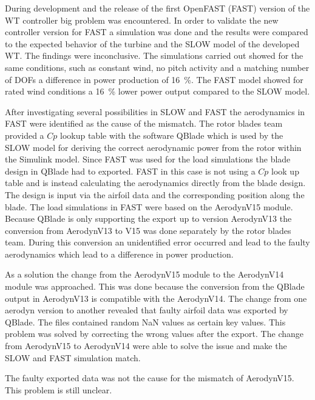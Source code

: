 During development and the release of the first OpenFAST (FAST) version of the WT controller big problem was encountered.
In order to validate the new controller version for FAST a simulation was done and the results were compared to the expected behavior of the turbine and the SLOW model of the developed WT.
The findings were inconclusive.
The simulations carried out showed for the same conditions, such as constant wind, no pitch activity and a matching number of DOFs a difference in power production of \SI{16}{\%}. The FAST model showed for rated wind conditions a \SI{16}{\%} lower power output compared to the SLOW model.

After investigating several possibilities in SLOW and FAST the aerodynamics in FAST were identified as the cause of the mismatch.
The rotor blades team provided a $Cp$ lookup table with the software QBlade which is used by the SLOW model for deriving the correct aerodynamic power from the rotor within the Simulink model.
Since FAST was used for the load simulations the blade design in QBlade had to exported. FAST in this case is not using a $Cp$ look up table and is instead calculating the aerodynamics directly from the blade design.
The design is input via the airfoil data and the corresponding position along the blade.
The load simulations in FAST were based on the AerodynV15 module.
Because QBlade is only supporting the export up to version AerodynV13 the conversion from AerodynV13 to V15 was done separately by the rotor blades team.
During this conversion an unidentified error occurred and lead to the faulty aerodynamics which lead to a difference in power production.

As a solution the change from the AerodynV15 module to the AerodynV14 module was approached.
This was done because the conversion from the QBlade output in AerodynV13 is compatible with the AerodynV14.
The change from one aerodyn version to another revealed that faulty airfoil data was exported by QBlade. The files contained random NaN values as certain key values. This problem was solved by correcting the wrong values after the export. The change from AerodynV15 to AerodynV14 were able to solve the issue and make the SLOW and FAST simulation match.

The faulty exported data was not the cause for the mismatch of AerodynV15. This problem is still unclear. 

